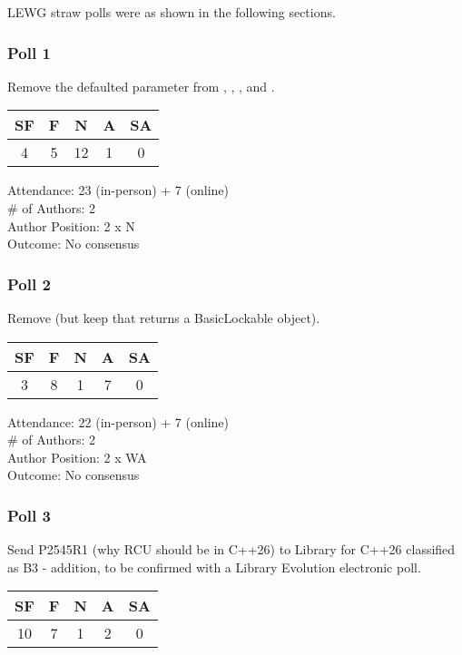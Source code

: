 LEWG straw polls were as shown in the following sections.

\subsubsection{Poll 1}
\label{sec:kona2022:Poll 1}

Remove the defaulted  parameter from
, , , and
.

\begin{tabular}{c|c|c|c|c}
SF & F &  N & A & SA \\
\hline
 4 & 5 & 12 & 1 &  0 \\
\end{tabular}

Attendance: 23 (in-person) + 7 (online) \\
\# of Authors: 2 \\
Author Position: 2 x N \\
Outcome: No consensus

\subsubsection{Poll 2}
\label{sec:kona2022:Poll 2}

Remove  (but keep  that returns a BasicLockable object).

\begin{tabular}{c|c|c|c|c}
SF & F &  N & A & SA \\
\hline
 3 & 8 &  1 & 7 &  0 \\
\end{tabular}

Attendance: 22 (in-person) + 7 (online) \\
\# of Authors: 2 \\
Author Position: 2 x WA \\
Outcome: No consensus

\subsubsection{Poll 3}
\label{sec:kona2022:Poll 3}

Send P2545R1 (why RCU should be in C++26) to Library for C++26 classified as B3 - addition, to be confirmed with a Library Evolution electronic poll.

\begin{tabular}{c|c|c|c|c}
SF & F &  N & A & SA \\
\hline
10 & 7 &  1 & 2 &  0 \\
\end{tabular}

